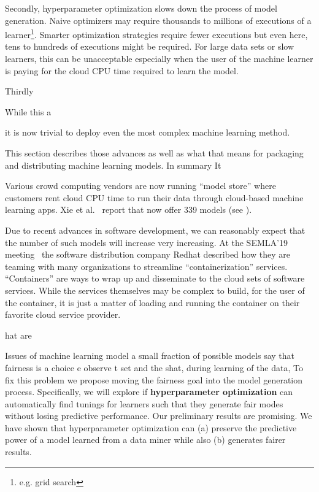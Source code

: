 Secondly,  hyperparameter optimization slows down the process of model generation. Naive optimizers may require thousands to millions of executions of a learner\footnote{e.g. grid search}. Smarter optimization strategies require fewer executions but even here, tens to hundreds of executions might be required. For large data sets or slow learners, this can be unacceptable especially when the user of the machine learner is paying for the cloud CPU time required to learn the model. 

Thirdly


While this a
  
it is now trivial to deploy even
the most complex machine learning method. 

This section
describes those advances as well as what that means
for packaging and distributing machine learning models.
In summary 
It 


  Various crowd computing vendors are now running ``model store'' where customers
  rent cloud CPU time to run their data through cloud-based machine learning apps. Xie et al.~\cite{xiu2019exploratory} report that  
  now offer 339 models (see ). 
  
Due to recent advances in software development,
we can reasonably expect that the number of such models will increase very    increasing. At the SEMLA'19 meeting~\cite{semla19}
the software distribution company Redhat described how they are
teaming with many organizations to streamline ``containerization'' services. ``Containers'' are ways to wrap up and disseminate to the cloud sets of software services. While the services themselves may be complex to build, for the user of the container, it is just a matter of loading and running the container on their favorite cloud service provider. 

hat are 

Issues of machine learning model 
a small fraction of   possible models say that {\e fairness is a choice}
e observe t set and the shat, during learning of the data,  To fix this problem we propose moving the fairness goal into the model generation process. Specifically, we will explore if 
  {\bf  hyperparameter optimization} can automatically find tunings for learners such that they generate fair modes without losing predictive performance. Our preliminary results are promising. We have shown that  hyperparameter optimization can (a) preserve the predictive power of a model learned from a data miner while also (b) generates fairer results. 
  
